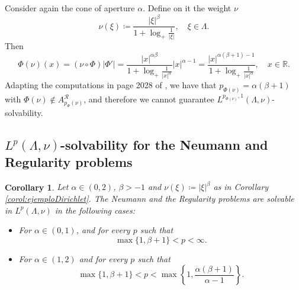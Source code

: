 \documentclass[12pt]{amsart}
\newcommand{\R}{\mathbb{R}}
\theoremstyle{plain}
\newtheorem{corollary}[theorem]{Corollary}
\theoremstyle{definition}
\numberwithin{equation}{section}
\begin{document}
Consider again the cone of aperture $\alpha$. Define on it the weight $\nu$ 
\begin{equation}\label{eq:measureNonSolvableEndpointDirichlet}
\nu(\xi)
\coloneqq 
\frac{|\xi|^{\beta}}{1+\log_{+}{\frac{1}{|\xi|}}},\quad \xi\in\Lambda.
\end{equation}
Then
\[
 \Phi(\nu)(x)
=
\left(
\nu\circ\Phi
\right)
|\Phi'|
=
\frac{|x|^{\alpha\beta}}{1+\log_{+}\frac{1}{|x|^{\alpha}}}|x|^{\alpha-1}
=
\frac{|x|^{\alpha(\beta+1)-1}}{1+\log_{+}\frac{1}{|x|^{\alpha}}},
\quad x\in\R.
\]
Adapting the computations in page 2028 of \cite{CarroOrtiz}, we have that $p_{\Phi(\nu)}=\alpha(\beta+1)$ with $\Phi(\nu)\not\in A_{p_{\Phi}(\nu)}^{\mathcal{R}}$, and therefore we cannot guarantee $L^{p_{\Phi(\nu)},1}(\Lambda,\nu)$-solvability. 







\subsection{\texorpdfstring{$L^{p}(\Lambda,\nu)$}{}-solvability for the Neumann and Regularity problems}




\begin{corollary}\label{corol:exampleLp}
Let $\alpha\in (0,2)$, $\beta>-1$ and $\nu(\xi)\coloneqq |\xi|^{\beta}$ as in Corollary \ref{corol:ejemploDirichlet}. The Neumann and the Regularity problems are solvable in $L^p(\Lambda, \nu)$ in the following cases: 
\begin{itemize}
    \item For $\alpha\in (0,1)$, and for every $p$ such that 
    \[
    \max\{1,\beta+1\}<p<\infty.
    \]
    \item For $\alpha\in (1,2)$ and for every $p$ such that 
    \[
   \max\{1,\beta+1\}< p<     
    \max\left\{1,\frac{\alpha(\beta+1)}{\alpha-1}\right\}.
    \]
\end{itemize}
\end{corollary}
\end{document}
